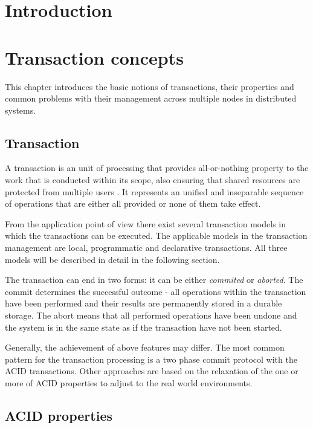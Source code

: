 \documentclass[oneside,
  digital, %
  table,   %
  nolof,     %
  nolot,     %
]{fithesis3}
\begin{document}
\chapter{Introduction}

\clearpage
\chapter{Transaction concepts}

This chapter introduces the basic notions of transactions, their properties and common problems with their management across multiple nodes in distributed systems. 

\section{Transaction}

A transaction is an unit of processing that provides all-or-nothing property to the work that is conducted within its scope, also ensuring that shared resources are protected from multiple users \cite{java_tran_processing}. It represents an unified and inseparable sequence of operations that are either all provided or none of them take effect. 

From the application point of view there exist several transaction models in which the transactions can be executed. The applicable models in the transaction management are local, programmatic and declarative transactions. All three models will be described in detail in the following section.

The transaction can end in two forms: it can be either \textit{commited} or \textit{aborted}. The commit determines the successful outcome - all operations within the transaction have been performed and their results are permanently stored in a durable storage. The abort means that all performed operations have been undone and the system is in the same state as if the transaction have not been started.

Generally, the achievement of above features may differ. The most common pattern for the transaction processing is a two phase commit protocol with the ACID transactions. Other approaches are based on the relaxation of the one or more of ACID properties to adjust to the real world environments.

\section{ACID properties}
\end{document}
